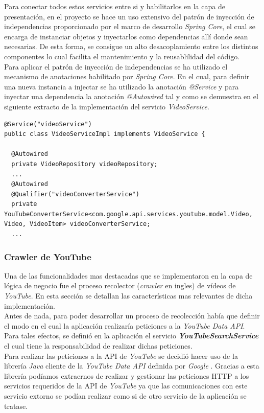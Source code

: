 \documentclass[11pt,a4paper]{article}
\begin{document}
Para conectar todos estos servicios entre si y habilitarlos en la capa de presentación, en el proyecto se hace un uso extensivo del patrón de inyección de independencias proporcionado por el marco de desarrollo \textit{Spring Core}, el cual se encarga de instanciar objetos y inyectarlos como dependencias allí donde  sean necesarias. De esta forma, se consigue un alto desacoplamiento entre los distintos componentes lo cual facilita el mantenimiento y la reusablilidad del código.
\\

Para aplicar el patrón de inyección de independencias se ha utilizado el mecanismo de anotaciones habilitado por \textit{Spring Core}. En el cual, para definir una nueva instancia a injectar se ha utilizado la anotación \textit{@Service} y para inyectar una dependencia la anotación \textit{@Autowired} tal y como se demuestra en el siguiente extracto de la implementación del servicio \textit{VideoService}.
\begin{lstlisting}[style=C]
@Service("videoService")
public class VideoServiceImpl implements VideoService {
  
  @Autowired
  private VideoRepository videoRepository;
  ...
  @Autowired
  @Qualifier("videoConverterService")
  private YouTubeConverterService<com.google.api.services.youtube.model.Video, Video, VideoItem> videoConverterService;
  ...
\end{lstlisting}	

\medskip 

\subsubsection{Crawler de YouTube}
Una de las funcionalidades mas destacadas que se implementaron en la capa de lógica de negocio fue el proceso recolector (\textit{crawler} en ingles) de vídeos de \textit{YouTube}. En esta sección se detallan las características mas relevantes de dicha implementación.
\\

Antes de nada, para poder desarrollar un proceso de recolección había que definir el modo en el cual la aplicación realizaría peticiones a la \textit{YouTube Data API}. Para tales efectos, se definió en la aplicación el servicio \textit{\textbf{YouTubeSearchService}} el cual tiene la responsabilidad de realizar dichas peticiones.
\\

Para realizar las peticiones a la API de \textit{YouTube} se decidió hacer uso de la librería \textit{Java} cliente de la \textit{YouTube Data API} definida por \textit{Google} \cite{45}. Gracias a esta librería podíamos extraernos de realizar y gestionar las peticiones HTTP a los servicios requeridos de la API de \textit{YouTube} ya que las comunicaciones con este servicio extorno se podían realizar como si de otro servicio de la aplicación se tratase.
\\
\end{document}
